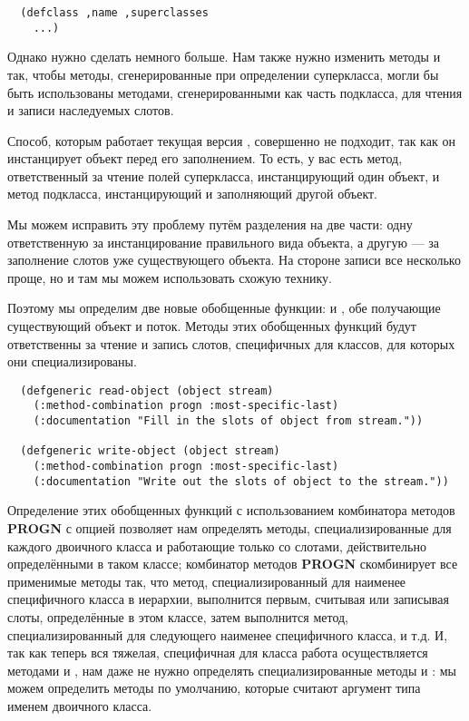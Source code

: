 \begin{lstlisting}
  (defclass ,name ,superclasses
    ...)
\end{lstlisting}

Однако нужно сделать немного больше. Нам также нужно изменить методы  и
 так, чтобы методы, сгенерированные при определении суперкласса, могли
бы быть использованы методами, сгенерированными как часть подкласса, для чтения и записи
наследуемых слотов.

Способ, которым работает текущая версия , совершенно не подходит, так как
он инстанцирует объект перед его заполнением. То есть, у вас есть метод, ответственный за
чтение полей суперкласса, инстанцирующий один объект, и метод подкласса, инстанцирующий и
заполняющий другой объект.

Мы можем исправить эту проблему путём разделения  на две части: одну
ответственную за инстанцирование правильного вида объекта, а другую --- за заполнение
слотов уже существующего объекта. На стороне записи все несколько проще, но и там мы можем
использовать схожую технику.

Поэтому мы определим две новые обобщенные функции:  и
, обе получающие существующий объект и поток. Методы этих обобщенных
функций будут ответственны за чтение и запись слотов, специфичных для классов, для которых
они специализированы.

\begin{lstlisting}
  (defgeneric read-object (object stream)
    (:method-combination progn :most-specific-last)
    (:documentation "Fill in the slots of object from stream."))

  (defgeneric write-object (object stream)
    (:method-combination progn :most-specific-last)
    (:documentation "Write out the slots of object to the stream."))
\end{lstlisting}

Определение этих обобщенных функций с использованием комбинатора методов \textbf{PROGN} с
опцией  позволяет нам определять методы, специализированные для
каждого двоичного класса и работающие только со слотами, действительно определёнными в
таком классе; комбинатор методов \textbf{PROGN} скомбинирует все применимые методы так,
что метод, специализированный для наименее специфичного класса в иерархии, выполнится
первым, считывая или записывая слоты, определённые в этом классе, затем выполнится метод,
специализированный для следующего наименее специфичного класса, и т.д. И, так как теперь
вся тяжелая, специфичная для класса работа осуществляется методами  и
, нам даже не нужно определять специализированные методы
 и : мы можем определить методы по умолчанию, которые
считают аргумент типа именем двоичного класса.

